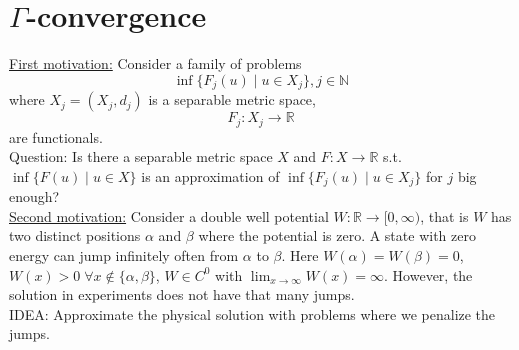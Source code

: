 \documentclass[a4paper, 12pt]{article}
\theoremstyle{plain}
\theoremstyle{definition}
\theoremstyle{lemma}
\theoremstyle{remark}
\theoremstyle{corollary}
\theoremstyle{example}
\begin{document}
\section{$\Gamma$-convergence}
	\underline{First motivation:} Consider a family of problems \[\inf\{F_j(u) \mid u \in X_j\}, j \in \mathbb{N}\]
	where $X_j = (X_j,d_j)$ is a separable metric space, \[F_j : X_j \to \mathbb{R}\] are functionals.\\
	Question: Is there a separable metric space $X$ and $F:X \to \mathbb{R}$ s.t. $\inf\{F(u) \mid u \in X\}$ is an approximation of $\inf\{F_j(u) \mid u \in X_j\}$ for $j$ big enough?\\
	\underline{Second motivation:} Consider a double well potential $W: \mathbb{R} \to [0,\infty)$, that is $W$ has two distinct positions $\alpha$ and $\beta$ where the potential is zero. A state with zero energy can jump infinitely often from $\alpha$ to $\beta$. Here $W(\alpha) = W(\beta) = 0$, $W(x) > 0 \; \forall x \notin \{\alpha, \beta\}$, $W \in C^0$ with $\lim_{x \to \infty} W(x) = \infty$. However, the solution in experiments does not have that many jumps.\\
	IDEA: Approximate the physical solution with problems where we penalize the jumps.
\end{document}
